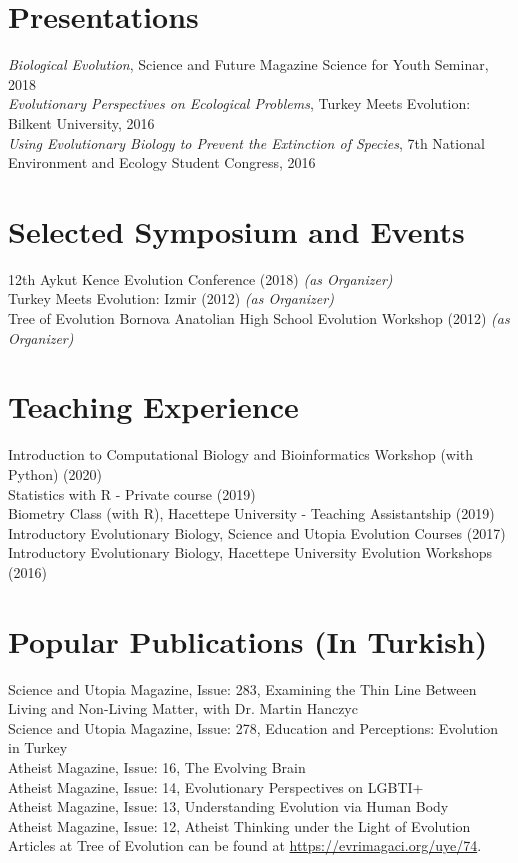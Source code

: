 \documentclass[letterpaper,11pt]{article}
\begin{document}
\section{Presentations}
{\textit{Biological Evolution}}, Science and Future Magazine Science for Youth Seminar, 2018 \\
{\textit{Evolutionary Perspectives on Ecological Problems}}, Turkey Meets Evolution: Bilkent University, 2016 \\
{\textit{Using Evolutionary Biology to Prevent the Extinction of
Species}}, 7th National Environment and Ecology Student Congress, 2016

\section{Selected Symposium and Events}
12th Aykut Kence Evolution Conference (2018) \textit{(as Organizer)} \\
Turkey Meets Evolution: Izmir (2012) \textit{(as Organizer)} \\
Tree of Evolution Bornova Anatolian High School Evolution Workshop (2012) \textit{(as Organizer)} \\

\section{Teaching Experience}
Introduction to Computational Biology and Bioinformatics Workshop (with Python) (2020)\\
Statistics with R - Private course (2019) \\
Biometry Class (with R), Hacettepe University - Teaching Assistantship (2019) \\
Introductory Evolutionary Biology, Science and Utopia Evolution Courses (2017) \\
Introductory Evolutionary Biology, Hacettepe University Evolution Workshops (2016) \\


\section{Popular Publications (In Turkish)}
Science and Utopia Magazine, Issue: 283, Examining the Thin Line Between Living and Non-Living Matter, with Dr. Martin Hanczyc \\
Science and Utopia Magazine, Issue: 278, Education and Perceptions: Evolution in Turkey \\
Atheist Magazine, Issue: 16, The Evolving Brain \\
Atheist Magazine, Issue: 14, Evolutionary Perspectives on LGBTI+ \\
Atheist Magazine, Issue: 13, Understanding Evolution via Human Body \\
Atheist Magazine, Issue: 12, Atheist Thinking under the Light of Evolution \\
Articles at Tree of Evolution can be found at \href{https://evrimagaci.org/uye/74}{https://evrimagaci.org/uye/74}. 
\end{document}
